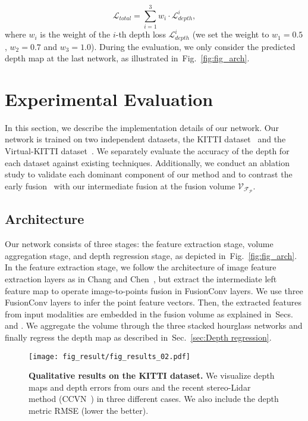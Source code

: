 \documentclass[letterpaper, 10 pt, conference]{ieeeconf}
\newcommand{\Fref}[1]{Fig.~\textcolor{blue}{\ref{#1}}}
\newcommand{\Sref}[1]{Sec.~\textcolor{blue}{\ref{#1}}}
\newcommand{\RNum}[1]{\uppercase\expandafter{\romannumeral #1\relax}}
\begin{document}
\begin{equation}
    \mathcal{L}_{total} = \sum_{i=1}^{3} w_{i} \cdot \mathcal{L}_{depth}^{i},
\end{equation}
where $w_i$ is the weight of the $i$-th depth loss $\mathcal{L}_{depth}^{i}$ (we set the weight to $w_{1}{=}0.5$, $w_{2}{=}0.7$ and $w_{3}{=}1.0$). During the evaluation, we only consider the predicted depth map at the last network, as illustrated in~\Fref{fig:fig_arch}. 





\section{Experimental Evaluation}
\label{sec:Experimental Evaluation}
In this section, we describe the implementation details of our network. Our network is trained on two independent datasets, the KITTI dataset~\cite{kitti-completion} and the Virtual-KITTI dataset~\cite{virtual-kitti}. We separately evaluate the accuracy of the depth for each dataset against existing techniques. Additionally, we conduct an ablation study to validate each dominant component of our method and to contrast the early fusion~\cite{stereolidar_norm_costV_ccvn} with our intermediate fusion at the fusion volume $\mathcal{V}_{\mathcal{F}_{\mathcal{P}}}$.

\vspace{-1mm}
\subsection{Architecture}
\label{subsec:Architecture}
Our network consists of three stages: the feature extraction stage, volume aggregation stage, and depth regression stage, as depicted in~\Fref{fig:fig_arch}. In the feature extraction stage, we follow the architecture of image feature extraction layers as in Chang and Chen~\cite{psmnet}, but extract the intermediate left feature map to operate image-to-points fusion in FusionConv layers. We use three FusionConv layers to infer the point feature vectors. Then, the extracted features from input modalities are embedded in the fusion volume as explained in~Secs.~\textcolor{blue}{\RNum{4}} and \textcolor{blue}{\RNum{5}}. We aggregate the volume through the three stacked hourglass networks and finally regress the depth map as described in~\Sref{sec:Depth regression}. 

\begin{figure*}[!t]
\vspace{+3mm}
\centering
\texttt{[image: fig\_result/fig\_results\_02.pdf]}
\vspace{-3mm}
\caption{\textbf{Qualitative results on the KITTI dataset.} 
We visualize depth maps and depth errors from ours and the recent stereo-Lidar method (CCVN~\cite{stereolidar_norm_costV_ccvn}) in three different cases. 
We also include the depth metric RMSE (lower the better).
}
\label{fig:fig_result}
\vspace{-2mm}
\end{figure*}
\end{document}
